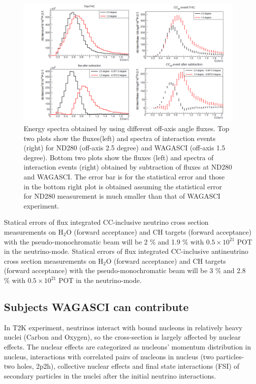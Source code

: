 \begin{figure}[tbh]
\begin{center}
\includegraphics[width=\textwidth]{fig/fluxsubtractFHC.pdf}
\end{center}
\caption{Energy spectra obtained by using different off-axis angle fluxes.
  Top two plots show the fluxes(left) and spectra of interaction events (right) for ND280 (off-axis 2.5 degree) and WAGASCI (off-axis 1.5 degree). Bottom two plots show the fluxes (left) and spectra of interaction events (right) obtained by
  subtraction of fluxes at ND280 and WAGASCI.
  The error bar is for the statistical error and those in the bottom right plot is obtained assuming the statistical error
  for ND280 measurement is much smaller than that of WAGASCI experiment.
}
\label{fig:fluxsubtfhc}
\end{figure}


Statical errors of flux integrated CC-inclusive neutrino cross section measurements on H$_{2}$O (forward acceptance) and CH targets (forward acceptance) with the pseudo-monochromatic beam
will be 2 \% and 1.9 \% with $0.5\times 10^{21}$ POT in the neutrino-mode.
Statical errors of flux integrated CC-inclusive antineutrino cross section measurements on H$_{2}$O (forward acceptance) and CH targets (forward acceptance) with the pseudo-monochromatic beam
will be 3 \% and 2.8 \% with $0.5\times 10^{21}$ POT in the neutrino-mode.


\subsection{Subjects WAGASCI can contribute}
In T2K experiment, neutrinos interact with bound nucleons in relatively heavy nuclei (Carbon and Oxygen), so the cross-section is largely affected by nuclear effects.
The nuclear effects are categorized as nucleons' momentum distribution in nucleus, interactions with  correlated pairs of nucleons in nucleus (two particles-two holes, 2p2h), collective nuclear effects 
and final state interactions (FSI) of secondary particles in the nuclei after the initial neutrino interactions.


